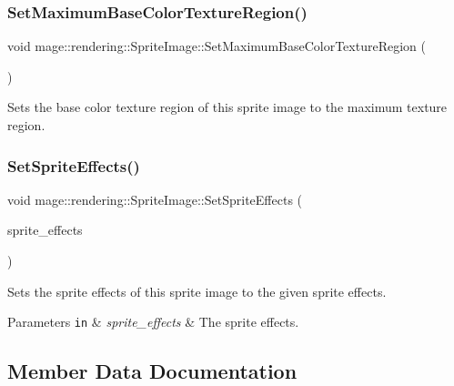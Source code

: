 \subsubsection{\texorpdfstring{Set\+Maximum\+Base\+Color\+Texture\+Region()}{SetMaximumBaseColorTextureRegion()}}
{\footnotesize\ttfamily void mage\+::rendering\+::\+Sprite\+Image\+::\+Set\+Maximum\+Base\+Color\+Texture\+Region (\begin{DoxyParamCaption}{ }\end{DoxyParamCaption})\hspace{0.3cm}{\ttfamily [noexcept]}}

Sets the base color texture region of this sprite image to the maximum texture region. \hypertarget{classmage_1_1rendering_1_1_sprite_image_a504ebb2cdc216d26bdbcb24cfa5466d4}{}\label{classmage_1_1rendering_1_1_sprite_image_a504ebb2cdc216d26bdbcb24cfa5466d4} 
\subsubsection{\texorpdfstring{Set\+Sprite\+Effects()}{SetSpriteEffects()}}
{\footnotesize\ttfamily void mage\+::rendering\+::\+Sprite\+Image\+::\+Set\+Sprite\+Effects (\begin{DoxyParamCaption}\item[{\hyperlink{namespacemage_1_1rendering_a4dbc3536c87b906f1d41d863ec458e78}{Sprite\+Effect}}]{sprite\+\_\+effects }\end{DoxyParamCaption})\hspace{0.3cm}{\ttfamily [noexcept]}}

Sets the sprite effects of this sprite image to the given sprite effects.


\begin{DoxyParams}[1]{Parameters}
\mbox{\tt in}  & {\em sprite\+\_\+effects} & The sprite effects. \\
\hline
\end{DoxyParams}


\subsection{Member Data Documentation}
\hypertarget{classmage_1_1rendering_1_1_sprite_image_a9f17f78cd6731bc604daa2b4f2593435}{}\label{classmage_1_1rendering_1_1_sprite_image_a9f17f78cd6731bc604daa2b4f2593435} 
